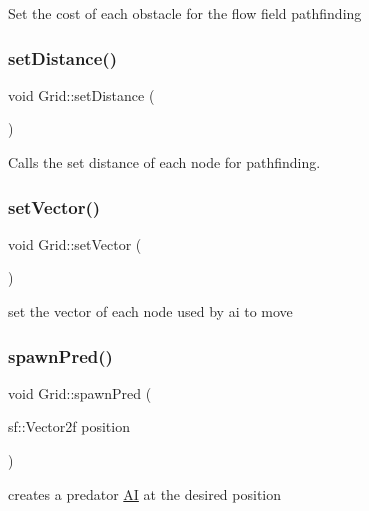 Set the cost of each obstacle for the flow field pathfinding 

\mbox{\label{class_grid_a357745b9903ca9c2a9c70024ad079ed1}} 
\subsubsection{\texorpdfstring{setDistance()}{setDistance()}}
{\footnotesize\ttfamily void Grid\+::set\+Distance (\begin{DoxyParamCaption}{ }\end{DoxyParamCaption})\hspace{0.3cm}{\ttfamily [private]}}



Calls the set distance of each node for pathfinding. 

\mbox{\label{class_grid_ad4dcab53aae83978a77ad6b9cd459c3e}} 
\subsubsection{\texorpdfstring{setVector()}{setVector()}}
{\footnotesize\ttfamily void Grid\+::set\+Vector (\begin{DoxyParamCaption}{ }\end{DoxyParamCaption})\hspace{0.3cm}{\ttfamily [private]}}



set the vector of each node used by ai to move 

\mbox{\label{class_grid_a2e1a97e06b3d2fcc27e2ea40e80f1f85}} 
\subsubsection{\texorpdfstring{spawnPred()}{spawnPred()}}
{\footnotesize\ttfamily void Grid\+::spawn\+Pred (\begin{DoxyParamCaption}\item[{sf\+::\+Vector2f}]{position }\end{DoxyParamCaption})}



creates a predator \mbox{\hyperlink{class_a_i}{AI}} at the desired position 


